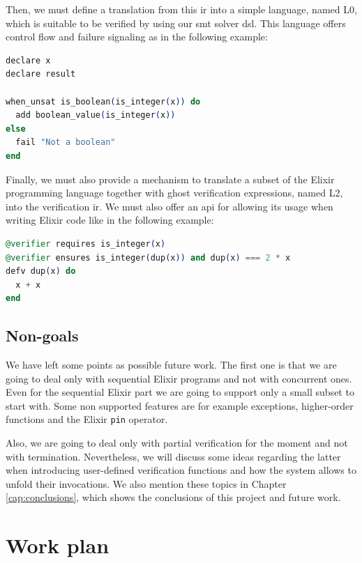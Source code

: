 Then, we must define a translation from this \gls{ir} into a simple language,
named L0, which is suitable to be verified by using our \acrshort{smt} solver
\gls{dsl}. This language offers control flow and failure signaling as in the
following example:

\begin{lstlisting}[language=elixir,numbers=none,frame=none]
declare x
declare result 

when_unsat is_boolean(is_integer(x)) do 
  add boolean_value(is_integer(x))
else 
  fail "Not a boolean"
end
\end{lstlisting}

Finally, we must also provide a mechanism to translate a subset of the Elixir
programming language together with ghost verification expressions, named L2,
into the verification \gls{ir}. We must also offer an \gls{api} for allowing its
usage when writing Elixir code like in the following example:

\begin{lstlisting}[language=elixir,numbers=none,frame=none]
@verifier requires is_integer(x)
@verifier ensures is_integer(dup(x)) and dup(x) === 2 * x
defv dup(x) do
  x + x
end
\end{lstlisting}

\subsection{Non-goals}

We have left some points as possible future work. The first one is that we are
going to deal only with sequential Elixir programs and not with concurrent ones.
Even for the sequential Elixir part we are going to support only a small subset 
to start with. Some non supported features are for example exceptions,
higher-order functions and the Elixir \verb|pin| operator.

Also, we are going to deal only with partial verification for the moment and not
with termination. Nevertheless, we will discuss some ideas regarding the latter
when introducing user-defined verification functions and how the system allows
to unfold their invocations. We also mention these topics in Chapter
\ref{cap:conclusions}, which shows the conclusions of this project and future
work.

\section{Work plan}

